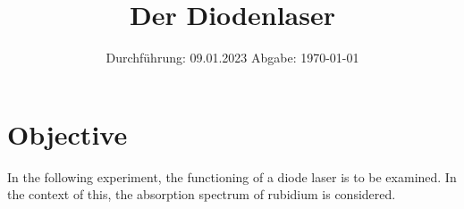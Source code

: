 

\subject{V60}
\title{Der Diodenlaser}
\date{
    Durchführung: 09.01.2023
     \hspace{3em}
    Abgabe: \today %
}


\maketitle
\thispagestyle{empty}
\tableofcontents
\newpage

\section{Objective}

    In the following experiment,
    the functioning of a diode laser is to be examined.
    In the context of this,
    the absorption spectrum of rubidium is considered.


\clearpage


\clearpage


\clearpage


\clearpage

\printbibliography


